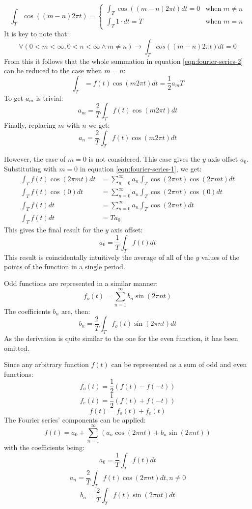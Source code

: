 \documentclass{article}
\begin{document}
\[
	\int_{T} \cos( (m - n) 2 \pi t) = 
	\begin{cases}
		\int_{T} \cos ( (m -n) 2 \pi t) dt = 0 & \text{when } m \neq n \\
		\int_{T} 1 \cdot dt = T & \text{when } m = n
	\end{cases}
\]
It is key to note that:
$$\forall (0 < m < \infty, 0 < n < \infty \land m \neq n) \rightarrow
\int_{T} cos( (m - n) 2 \pi t) dt = 0$$
From this it follows that the whole summation in equation 
\ref{eqn:fourier-series-2} can be reduced to the case when $m = n$:
$$\int_T = f(t) \cos(m 2 \pi t) dt = \frac{1}{2} a_m T$$
To get $a_m$ is trivial:
\begin{equation*}
	a_m = \frac{2}{T} \int_T f(t) \cos(m 2 \pi t) dt
\end{equation*}
Finally, replacing $m$ with $n$ we get:
\begin{equation}
	a_n = \frac{2}{T} \int_T f(t) \cos(m 2 \pi t) dt
	\label{eqn:fourier-series-amp}
\end{equation}

However, the case of $m = 0$ is not considered. This case gives the $y$ axis 
offset $a_0$. Substituting with $m = 0$ in equation \ref{eqn:fourier-series-1}, 
we get:
$$
\begin{aligned}
\int_{T} f(t) \cos(2 \pi m t) dt &= 
\sum^{\infty}_{n=0} a_n \int_{T} \cos(2 \pi n t) \cos(2 \pi m t) dt \\ 
\int_T f(t) \cos(0) dt &= \sum^{\infty}_{n=0} a_n \int_T \cos(2 \pi n t) \cos(0) dt \\
\int_T f(t) dt &= \sum^{\infty}_{n=0} a_n \int_T \cos(2 \pi n t) dt \\
\int_T f(t) dt &= T a_0
\end{aligned}$$
This gives the final result for the $y$ axis offset:
\begin{equation}
	a_0 = \frac{1}{T} \int_T f(t) dt
	\label{eqn:fourier-series-yoffset}
\end{equation}
This result is coincidentally intuitively the average of all of the $y$ values 
of the points of the function in a single period.

Odd functions are represented in a similar manner:
$$f_o(t) = \sum^{\infty}_{n=1} b_n \sin(2 \pi n t)$$
The coefficients $b_n$ are, then:
$$b_n = \frac{2}{T}\int_T f_o(t) \sin(2 \pi n t) dt$$
As the derivation is quite similar to the one for the even function, it has 
been omitted.

Since any arbitrary function $f(t)$ can be represented as a sum of odd and even 
functions:
$$f_o(t) = \frac{1}{2}(f(t) - f(-t))$$
$$f_e(t) = \frac{1}{2}(f(t) + f(-t))$$
$$f(t) = f_o(t) + f_e(t)$$
The Fourier series' components can be applied:
$$f(t) = a_0 + \sum^{\infty}_{n=1} (a_n \cos(2 \pi n t) + b_n \sin(2 \pi n t))$$
with the coefficients being:
$$a_0 = \frac{1}{T} \int_T f(t) dt$$
$$a_n = \frac{2}{T} \int_T f(t) \cos(2 \pi n t) dt, n \neq 0$$
$$b_n = \frac{2}{T} \int_T f(t) \sin(2 \pi n t) dt$$
\end{document}
